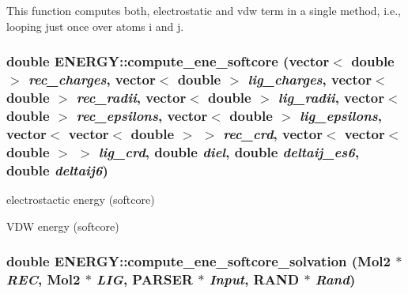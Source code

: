 \label{classENERGY_a71a6fd89c93fcd0a0a3a671c761972c2}
This function computes both, electrostatic and vdw term in a single method, i.e., looping just once over atoms i and j. \hypertarget{classENERGY_ad01bf537f4d415c8f3851c752b76cdcb}{
\subsubsection[{compute\_\-ene\_\-softcore}]{\setlength{\rightskip}{0pt plus 5cm}double ENERGY::compute\_\-ene\_\-softcore (vector$<$ double $>$ {\em rec\_\-charges}, \/  vector$<$ double $>$ {\em lig\_\-charges}, \/  vector$<$ double $>$ {\em rec\_\-radii}, \/  vector$<$ double $>$ {\em lig\_\-radii}, \/  vector$<$ double $>$ {\em rec\_\-epsilons}, \/  vector$<$ double $>$ {\em lig\_\-epsilons}, \/  vector$<$ vector$<$ double $>$ $>$ {\em rec\_\-crd}, \/  vector$<$ vector$<$ double $>$ $>$ {\em lig\_\-crd}, \/  double {\em diel}, \/  double {\em deltaij\_\-es6}, \/  double {\em deltaij6})}}
\label{classENERGY_ad01bf537f4d415c8f3851c752b76cdcb}


electrostactic energy (softcore)

VDW energy (softcore) \hypertarget{classENERGY_a40411aebcd70e744cb7f687585f63416}{
\subsubsection[{compute\_\-ene\_\-softcore\_\-solvation}]{\setlength{\rightskip}{0pt plus 5cm}double ENERGY::compute\_\-ene\_\-softcore\_\-solvation ({\bf Mol2} $\ast$ {\em REC}, \/  {\bf Mol2} $\ast$ {\em LIG}, \/  {\bf PARSER} $\ast$ {\em Input}, \/  {\bf RAND} $\ast$ {\em Rand})}}
\label{classENERGY_a40411aebcd70e744cb7f687585f63416}

